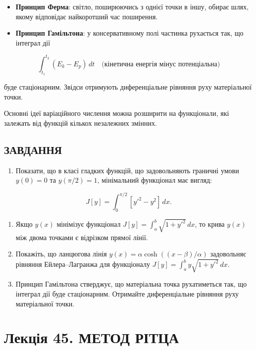 \documentclass[
  ukrainian,
]{article}
\providecommand{\tightlist}{%
  \setlength{\itemsep}{0pt}\setlength{\parskip}{0pt}}
\begin{document}
\begin{itemize}
\tightlist
\item
  \textbf{Принцип Ферма}: світло, поширюючись з однієї точки в іншу,
  обирає шлях, якому відповідає найкоротший час поширення.
\item
  \textbf{Принцип Гамільтона}: у консервативному полі частинка рухається
  так, що інтеграл дії
\end{itemize}

\[
\int_{t_1}^{t_2} (E_k - E_p)\, dt \quad \text{(кінетична енергія мінус потенціальна)}
\]

буде стаціонарним. Звідси отримують диференціальне рівняння руху
матеріальної точки.

Основні ідеї варіаційного числення можна розширити на функціонали, які
залежать від функцій кількох незалежних змінних.

\subsection{ЗАВДАННЯ}\label{ux437ux430ux432ux434ux430ux43dux43dux44f-23}

\begin{enumerate}
\def\labelenumi{\arabic{enumi}.}
\tightlist
\item
  Показати, що в класі гладких функцій, що задовольняють граничні умови
  \(y(0)=0\) та \(y(\pi/2)=1\), мінімальний функціонал має вигляд:
\end{enumerate}

\[
J[y] = \int_0^{\pi/2} [y'^2 - y^2]\, dx.
\]

\begin{enumerate}
\def\labelenumi{\arabic{enumi}.}
\setcounter{enumi}{1}
\item
  Якщо \(y(x)\) мінімізує функціонал
  \(J[y] = \int_a^b \sqrt{1+y'^2}\,dx\), то крива \(y(x)\) між двома
  точками є відрізком прямої лінії.
\item
  Покажіть, що ланцюгова лінія \(y(x) = \alpha\cosh((x-\beta)/\alpha)\)
  задовольняє рівняння Ейлера--Лагранжа для функціоналу
  \(J[y] = \int_a^b y\sqrt{1+y'^2}\,dx\).
\item
  Принцип Гамільтона стверджує, що матеріальна точка рухатиметься так,
  що інтеграл дії буде стаціонарним. Отримайте диференціальне рівняння
  руху матеріальної точки.
\end{enumerate}

\section{Лекція 45. МЕТОД
РІТЦА}\label{ux43bux435ux43aux446ux456ux44f-45.-ux43cux435ux442ux43eux434-ux440ux456ux442ux446ux430}
\end{document}
